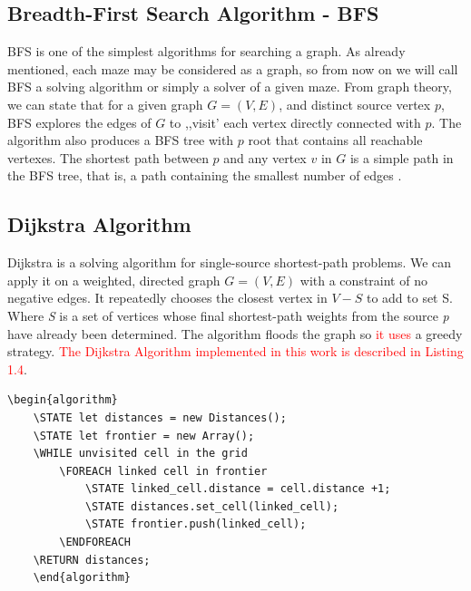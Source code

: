 \subsection{Breadth-First Search Algorithm - BFS}
BFS is one of the simplest algorithms for searching a graph. As already mentioned, each maze may be considered as a graph, so from now on we will call 
BFS  a solving algorithm or simply a solver of a given maze. From graph theory, we can state that for a given graph $ G = ( V, E) $, and distinct source 
vertex $p$, BFS explores the edges of $G$ to ,,visit’ each vertex directly connected with $p$. The algorithm also produces a BFS tree with $p$ root that 
contains all reachable vertexes. The shortest path between $p$ and any vertex $v$ in $G$ is a simple path in the BFS tree, that is, a path containing
the smallest number of edges \cite{Cormen}.
\subsection{Dijkstra Algorithm}
Dijkstra is a solving algorithm for single-source shortest-path problems. We can apply it on a weighted, directed graph $G=(V, E)$ with a constraint of no negative edges. 
It repeatedly chooses the closest vertex in $V-S$ to add to set S. 
Where \textit{S} is a set of vertices whose final shortest-path weights from the source \textit{p} have already been determined.
The algorithm floods the graph so \textcolor{red}{it uses} a greedy strategy. \textcolor{red}{The Dijkstra Algorithm implemented in this work is described in Listing 1.4}.
\newline
\\
\begin{lstlisting}[caption={Pseudocode for a Dijkstra’s algorithm}]
	\begin{algorithm}
	\STATE let distances = new Distances();
	\STATE let frontier = new Array();
	\WHILE unvisited cell in the grid
		\FOREACH linked cell in frontier
			\STATE linked_cell.distance = cell.distance +1;
			\STATE distances.set_cell(linked_cell);
			\STATE frontier.push(linked_cell);
	    \ENDFOREACH
	\RETURN distances;
	\end{algorithm}
	\end{lstlisting}

